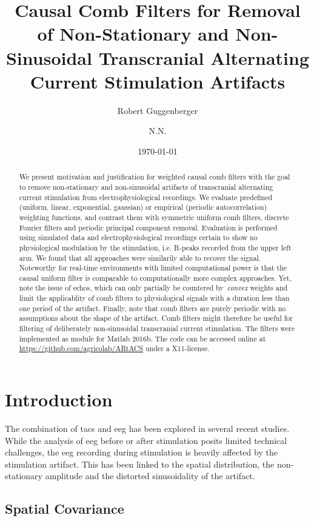 \documentclass[a4paper]{article}
\title{Causal Comb Filters for Removal of Non-Stationary and Non-Sinusoidal Transcranial Alternating Current Stimulation Artifacts}
\author[1,*]{Robert Guggenberger}
\author[1]{N.N.}
\affil[1]{Department for Translational Neurosurgery, University Hospital Tübingen}
\affil[*]{Corresponding author: \email{robert.guggenberger@posteo.eu}}
\date{\today}
\begin{document}
\maketitle
\thispagestyle{fancy}

\begin{abstract}
We present motivation and justification for weighted causal comb filters with the goal to remove non-stationary and non-sinusoidal artifacts of transcranial alternating current stimulation from electrophysiological recordings.
We evaluate predefined (uniform, linear, exponential, gaussian) or empirical (periodic autocorrelation) weighting functions, and contrast them with symmetric uniform comb filters, discrete Fourier filters and periodic principal component removal.
Evaluation is performed using simulated data and electrophysiological recordings certain to show no physiological modulation by the stimulation, i.e. R-peaks recorded from the upper left arm.
We found that all approaches were similarily able to recover the signal. Noteworthy for real-time environments with limited computational power is that the causal uniform filter is comparable to computationally more complex approaches.
Yet, note the issue of echos, which can only partially be countered by~\emph{convex} weights and limit the applicablity of comb filters to physiological signals with a duration less than one period of the artifact.
Finally, note that comb filters are purely periodic with no assumptions about the shape of the artifact. Comb filters might therefore be useful for filtering of deliberately non-sinusoidal transcranial current stimulation.
The filters were implemented as module for Matlab 2016b. The code can be accessed online at \url{https://github.com/agricolab/ARtACS} under a X11-license.

\end{abstract}

\section{Introduction}

The combination of \gls{tacs} and \gls{eeg} has been explored in several recent studies. While the analysis of \gls{eeg} before or after stimulation posits limited technical challenges, the \gls{eeg} recording during stimulation is heavily affected by the stimulation artifact. This has been linked to the spatial distribution, the non-stationary amplitude and the distorted sinusoidality of the artifact.

\subsection{Spatial Covariance}
\end{document}
